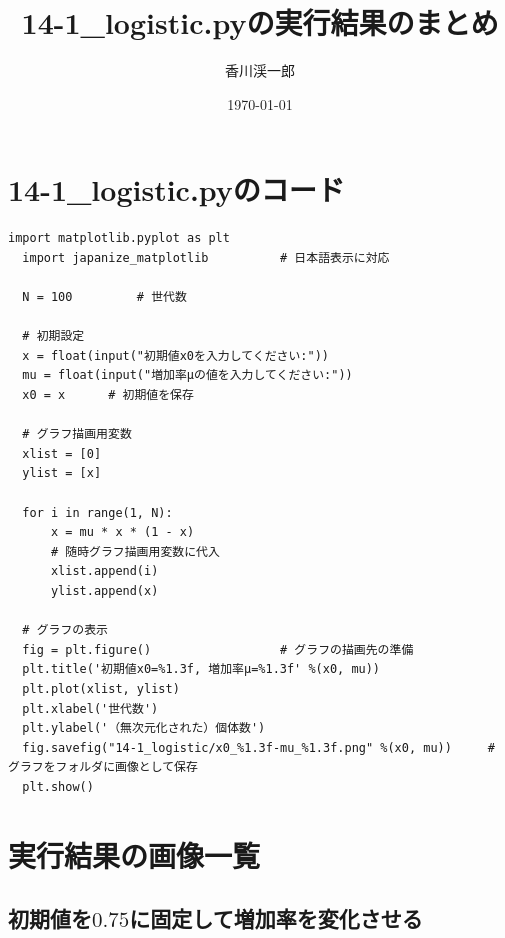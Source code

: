 \documentclass[a4paper, oneside]{jsarticle}
\begin{document}
\title{14-1\_logistic.pyの実行結果のまとめ}
\author{香川渓一郎}
\date{\today}

\maketitle

\setcounter{tocdepth}{1}
\tableofcontents

\section{14-1\_logistic.pyのコード}

\begin{lstlisting}[caption=14-1\_logistic.py, label=logistic]
  import matplotlib.pyplot as plt
  import japanize_matplotlib          # 日本語表示に対応
  
  N = 100         # 世代数
  
  # 初期設定
  x = float(input("初期値x0を入力してください:"))
  mu = float(input("増加率μの値を入力してください:"))
  x0 = x      # 初期値を保存
  
  # グラフ描画用変数
  xlist = [0]
  ylist = [x]
  
  for i in range(1, N):
      x = mu * x * (1 - x)
      # 随時グラフ描画用変数に代入
      xlist.append(i)
      ylist.append(x)
  
  # グラフの表示
  fig = plt.figure()                  # グラフの描画先の準備
  plt.title('初期値x0=%1.3f, 増加率μ=%1.3f' %(x0, mu))
  plt.plot(xlist, ylist)
  plt.xlabel('世代数')
  plt.ylabel('（無次元化された）個体数')
  fig.savefig("14-1_logistic/x0_%1.3f-mu_%1.3f.png" %(x0, mu))     # グラフをフォルダに画像として保存
  plt.show()
\end{lstlisting}

\section{実行結果の画像一覧}
\subsection{初期値を$0.75$に固定して増加率を変化させる}
\end{document}
